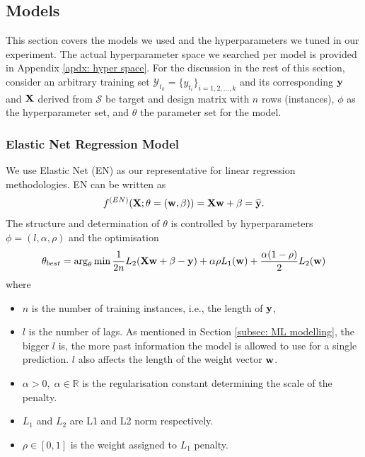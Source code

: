 \subsection{Models}\label{subsec: models}
This section covers the models we used and the hyperparameters we tuned in our experiment. The actual hyperparameter space we searched per model is provided in Appendix \ref{apdx: hyper space}. For the discussion in the rest of this section, consider an arbitrary training set $\mathcal{Y}_{t_k} = \{y_{t_i} \}_{i = 1, 2, \ldots, k}$ and its corresponding $\mathbf{y}$ and $\mathbf{X}$ derived from $\mathcal{S}$ be target and design matrix with $n$ rows (instances), $\phi$ as the hyperparameter set, and $\theta$ the parameter set for the model.

\subsubsection{Elastic Net Regression Model}
We use Elastic Net (EN) as our representative for linear regression methodologies. EN can be written as
\begin{gather*}
    f^{(EN)} (\mathbf{X} ; \theta = (\mathbf{w}, \mathbf{\beta})) = \mathbf{X} \mathbf{w} + \mathbf{\beta} = \widehat{\mathbf{y}}.
\end{gather*}
The structure and determination of $\theta$ is controlled by hyperparameters $\phi = (l, \alpha, \rho)$ and the optimisation
\begin{equation*}
    \theta_{best} = \arg_{\theta} \min \frac{1}{2n} L_2(\mathbf{X} \mathbf{w} + \mathbf{\beta} - \mathbf{y}) + \alpha \rho L_1(\mathbf{w}) + \frac{\alpha (1 - \rho)}{2} L_2(\mathbf{w})
\end{equation*}
where
\begin{itemize}
    \item $n$ is the number of training instances, i.e., the length of $\mathbf{y}$,
    \item $l$ is the number of lags. As mentioned in Section \ref{subsec: ML modelling}, the bigger $l$ is, the more past information the model is allowed to use for a single prediction. $l$ also affects the length of the weight vector $\mathbf{w}$.
    \item $\alpha > 0, \; \alpha \in \mathbb{R}$ is the regularisation constant determining the scale of the penalty.
    \item $L_1$ and $L_2$ are L1 and L2 norm respectively.
    \item $\rho \in [0, 1]$ is the weight assigned to $L_1$ penalty.
\end{itemize}

